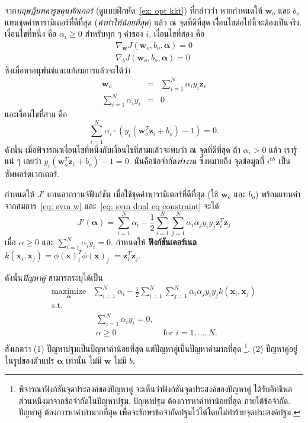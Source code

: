 จาก\textit{ทฤษฎีบทคารูชคุนทักเกอร์} (ดูแบบฝึกหัด~\ref{ex: opt kkt})
ที่กล่าวว่า 
หากกำหนดให้ $\bm{w}_o$ และ $b_o$ แทนชุดค่าพารามิเตอร์ที่ดีที่สุด (\textit{ค่าทำให้น้อยที่สุด}) แล้ว
ณ จุดที่ดีที่สุด  เงืื่อนไขต่อไปนี้จะต้องเป็นจริง.
เงื่อนไขที่หนึ่ง คือ $\alpha_i \geq 0$ สำหรับทุก ๆ ค่าของ $i$.
เงื่อนไขที่สอง คือ
\begin{eqnarray}
\nabla_{\bm{w}} J (\bm{w}_o, b_o, \bm{\alpha}) = 0
\nonumber \\
\nabla_{b} J(\bm{w}_o, b_o, \bm{\alpha}) = 0
\nonumber 
\end{eqnarray}
ซึ่งเมื่อหาอนุพันธ์และแก้สมการแล้วจะได้ว่า
\begin{eqnarray}
\bm{w}_o &=& \sum_{i=1}^N \alpha_i y_i \bm{z}_i
\label{eq: svm w} \\
\sum_{i=1}^N \alpha_i y_i &=& 0
\label{eq: svm dual eq constraint}
\end{eqnarray}
และเงื่อนไขที่สาม คือ
\[
\sum_{i=1}^N \alpha_i \cdot \left( y_i (\bm{w}_o^T \bm{z}_i + b_o) - 1 \right) = 0.
\]
ดังนั่น เมื่อพิจารณาเงื่อนไขที่หนึ่งกับเงื่อนไขที่สามแล้วจะพบว่า
ณ จุดที่ดีที่สุด
ถ้า $\alpha_i > 0$ แล้ว เรารู้แน่ ๆ เลยว่า $y_i (\bm{w}_o^T \bm{z}_i + b_o) - 1 = 0$.
นั่นคือข้อจำกัด\textit{ทำงาน}
ซึ่งหมายถึง จุดข้อมูลที่ $i^{th}$ เป็นซัพพอร์ตเวกเตอร์.

กำหนดให้ $J'$ แทนลากรานจ์ฟังก์ชัน เมื่อใช้ชุดค่าพารามิเตอร์ที่ดีที่สุด (ใช้ $\bm{w}_o$ และ $b_o$)
พร้อมแทนค่าจากสมการ~\ref{eq: svm w} และ~\ref{eq: svm dual eq constraint}
จะได้
\[
J'(\bm{\alpha}) = \sum_{i=1}^N \alpha_i 
   - \frac{1}{2}\sum_{i=1}^N \sum_{j=1}^N \alpha_i \alpha_j y_i y_j \bm{z}^T_i \bm{z}_j
\]
เมื่อ $\alpha \geq 0$ และ $\sum_{i=1}^N \alpha_i y_i = 0$.
กำหนดให้ \textbf{ฟังก์ชันเคอร์เนล}
$k(\bm{x}_i, \bm{x}_j) = \phi(\bm{x})^T_i \phi(\bm{x})_j$
$=\bm{z}^T_i \bm{z}_j$. 

ดังนั้น\textit{ปัญหาคู่} สามารถระบุได้เป็น
\begin{eqnarray}
\underset{\bm{\alpha}}{\mathrm{maximize}} &  \sum_{i=1}^N \alpha_i 
- \frac{1}{2}\sum_{i=1}^N \sum_{j=1}^N \alpha_i \alpha_j y_i y_j k(\bm{x}_i, \bm{x}_j) 
\nonumber \\
\mbox{s.t.} & 
\nonumber \\
&
\begin{array}{ll}
\sum_{i=1}^N \alpha_i y_i = 0, &  \\
\alpha \geq 0 & \mbox{ for } i =1, \ldots, N.
\end{array}
\label{eq: svm dual separable}
\end{eqnarray}
สังเกตว่า 
(1) ปัญหาปฐมเป็นปัญหาค่าน้อยที่สุด แต่ปัญหาคู่เป็นปัญหาค่ามากที่สุด%
\footnote{%
พิจารณาฟังก์ชันจุดประสงค์ของปัญหาคู่ จะเห็นว่าฟังก์ชันจุดประสงค์ของปัญหาคู่ ได้รับอิทธิพลส่วนหนึ่งมาจากข้อจำกัดในปัญหาปฐม.
ปัญหาปฐม ต้องการหาค่าทำน้อยที่สุด ภายใต้ข้อจำกัด.
ปัญหาคู่
ต้องการหาค่าทำมากที่สุด เพื่อจะรักษาข้อจำกัดปฐมไว้ได้โดยไม่ทำร้ายจุดประสงค์ปฐม.
}.
(2) ปัญหาคู่อยู่ในรูปของตัวแปร $\bm{\alpha}$ เท่านั้น ไม่มี $\bm{w}$ ไม่มี $b$.


